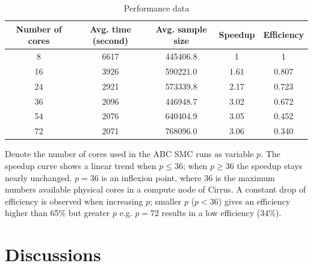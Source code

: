 \begin{table}[H]
    \centering
    \begin{tabular}{|c c c c c|}
        \hline
        Number of cores & Avg. time (second) & Avg. sample size & Speedup & Efficiency \\ [0.5ex]
        \hline\hline
        8               & 6617          & 445406.8              & 1       & 1          \\
        16              & 3926          & 590221.0              & 1.61    & 0.807      \\
        24              & 2921          & 573339.8              & 2.17    & 0.723      \\
        36              & 2096          & 446948.7              & 3.02    & 0.672      \\
        54              & 2076          & 640404.9              & 3.05    & 0.452      \\
        72              & 2071          & 768096.0              & 3.06    & 0.340      \\
        \hline
    \end{tabular}
    \caption{Performance data}
    \label{table:performance}
\end{table}

Denote the number of cores used in the ABC SMC runs as variable $p$. The speedup curve shows a linear trend when $p\leq 36$; when $p\geq 36$ the speedup stays nearly unchanged. $p=36$ is an inflexion point, where 36 is the maximum numbers available physical cores in a compute node of Cirrus. A constant drop of efficiency is observed when increasing $p$; smaller $p$ ($p<36$) gives an efficiency higher than 65\% but greater $p$ e.g. $p=72$ results in a low efficiency (34\%).



\section{Discussions}

